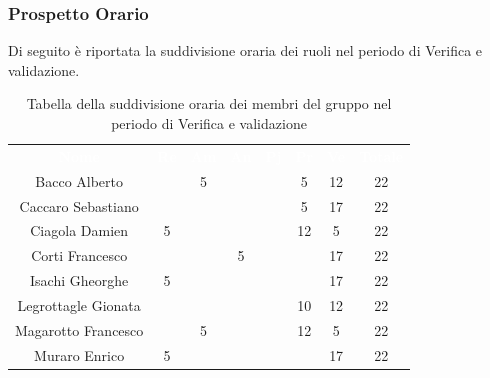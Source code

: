\subsubsection{Prospetto Orario}
Di seguito è riportata la suddivisione oraria dei ruoli nel periodo di Verifica e validazione.




\begin{table}[H]	
	\begin{center}
	    \begin{tabular}{cccccccc}
			\rowcolor{greySWEight}
			\textcolor{white}{\textbf{Nome}} & \textcolor{white}{\textbf{Re}} & \textcolor{white}{\textbf{Am}} & \textcolor{white}{\textbf{An}} & \textcolor{white}{\textbf{Pj}} & \textcolor{white}{\textbf{Pr}} & \textcolor{white}{\textbf{Ve}} & \textcolor{white}{\textbf{Totale}}
			\\
			Bacco Alberto & & 5 & & & 5 & 12 & 22 \\
			Caccaro Sebastiano & & & & & 5 & 17 & 22 \\
			Ciagola Damien & 5 & & & & 12 & 5 & 22 \\
			Corti Francesco & & & 5 & & & 17 & 22 \\
			Isachi Gheorghe & 5 & & & & & 17 & 22 \\
			Legrottagle Gionata & & & & & 10 & 12 & 22 \\
			Magarotto Francesco & & 5 & & & 12 & 5 & 22 \\
			Muraro Enrico & 5 & & & & & 17 & 22 \\
			\end{tabular}
	    \caption{Tabella della suddivisione oraria dei membri del gruppo nel periodo di Verifica e validazione} \label{tab:tabellaPersoneVerifica e validazione} 
	\end{center}
\end{table}

